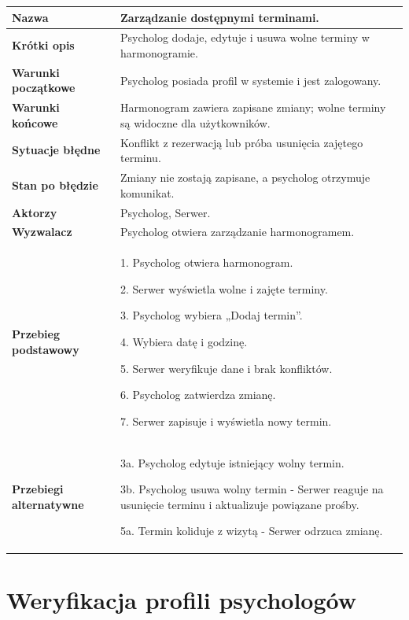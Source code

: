\documentclass[11pt,a4paper]{article}
\renewcommand{\arraystretch}{1.3}
\newcommand{\pole}[2]{
\textbf{#1} & #2 \\ \hline
}
\begin{document}
\begin{tabularx}{\textwidth}{|p{3.9cm}|Y|}
\hline

\pole{Nazwa}{
Zarządzanie dostępnymi terminami.
}

\pole{Krótki opis}{
Psycholog dodaje, edytuje i usuwa
wolne terminy w harmonogramie.
}

\pole{Warunki początkowe}{
Psycholog posiada profil w systemie i jest zalogowany.
}

\pole{Warunki końcowe}{
Harmonogram zawiera zapisane zmiany;
wolne terminy są widoczne dla użytkowników.
}

\pole{Sytuacje błędne}{
Konflikt z rezerwacją
lub próba usunięcia zajętego terminu.
}

\pole{Stan po błędzie}{
Zmiany nie zostają zapisane,
a psycholog otrzymuje komunikat.
}

\pole{Aktorzy}{
Psycholog,
Serwer.
}

\pole{Wyzwalacz}{
Psycholog otwiera zarządzanie harmonogramem.
}

\pole{Przebieg podstawowy}{
1. Psycholog otwiera harmonogram.\par
2. Serwer wyświetla wolne i zajęte terminy.\par
3. Psycholog wybiera „Dodaj termin”.\par
4. Wybiera datę i godzinę.\par
5. Serwer weryfikuje dane
i brak konfliktów.\par
6. Psycholog zatwierdza zmianę.\par
7. Serwer zapisuje i wyświetla nowy termin.
}

\pole{Przebiegi alternatywne}{
3a. Psycholog edytuje istniejący wolny termin.\par
3b. Psycholog usuwa wolny termin - Serwer reaguje na usunięcie terminu i aktualizuje powiązane prośby.\par
5a. Termin koliduje z wizytą -
Serwer odrzuca zmianę.
}

\end{tabularx}
\endgroup


\clearpage

\section*{Weryfikacja profili psychologów}

\begingroup
\small
\renewcommand{\arraystretch}{1.14}
\end{document}
